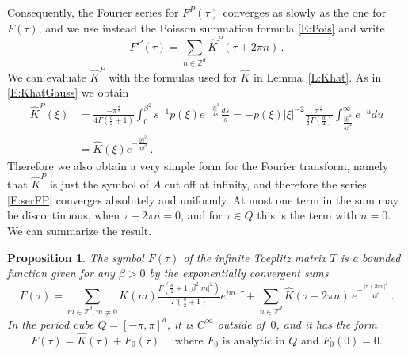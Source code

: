 \documentclass[12pt]{amsart}
\newtheorem{proposition}[theorem]{Proposition}
\theoremstyle{definition}
\theoremstyle{remark}
\numberwithin{equation}{section}
\newcommand\Z{{\mathbb Z}}
\let\hat=\widehat
\begin{document}
Consequently, the Fourier series for $F^{P}(\tau)$ converges as slowly as the one for $F(\tau)$, and we use instead the Poisson summation formula \eqref{E:Pois} and write
\begin{equation}
\label{E:serFP}
 F^{P}(\tau) = \sum_{n\in\Z^{d}}\hat K^{P}(\tau+2\pi n)\,.
\end{equation}
We can evaluate $\hat K^{P}$ with the formulas used for $\hat K$ in Lemma~\ref{L:Khat}. As in \eqref{E:KhatGauss} we obtain
\begin{equation}
\begin{aligned}
\label{E:KPhat=KhatxG}
 \hat K^{P}(\xi) &=
 \frac{-\pi^{\frac d2}}{4\Gamma(\frac d2+1)}\int_{0}^{\beta^{2}}\!\!\!\! s^{-1}p(\xi)e^{-\frac{|\xi|^{2}}{4s}}\tfrac{ds}{s}
=   -p(\xi) |\xi|^{-2} \frac{\pi^{\frac d2}}{\frac d2\Gamma(\frac d2)}\int_{\frac{|\xi|^{2}}{4\beta^{2}}}^{\infty} e^{-u}du\\
&= \hat K(\xi)  e^{-\frac{|\xi|^{2}}{4\beta^{2}}}\,.
\end{aligned}
\end{equation}
Therefore we also obtain a very simple form for the Fourier transform, namely that $\hat K^{P}$ is just the symbol of $A$ cut off at infinity, and therefore the series \eqref{E:serFP} converges absolutely and uniformly. At most one term in the sum may be discontinuous, when $\tau+2\pi n=0$, and for $\tau\in Q$ this is the term with $n=0$.
We can summarize the result.
\begin{proposition}
 \label{P:NumSym}
The symbol $F(\tau)$ of the infinite Toeplitz matrix $T$ is a bounded function given for any $\beta>0$ by the exponentially convergent sums
\begin{equation}
\label{E:Fewald}
 F(\tau) = 
 \sum_{m\in\Z^{d},m\ne0}K(m)\tfrac{\Gamma(\tfrac d2+1,\beta^{2}|m|^{2})}{\Gamma(\frac d2+1)}e^{im\cdot \tau} +
 \sum_{n\in\Z^{d}}\hat K(\tau+2\pi n)\,e^{-\frac{|\tau+2\pi n|^{2}}{4\beta^{2}}}\,.
\end{equation}
In the period cube $Q=[-\pi,\pi]^{d}$, it is $C^{\infty}$ outside of $\,0$, and it has the form
\begin{equation}
\label{E:F=F0+Khat} 
 F(\tau) = \hat K(\tau) + F_{0}(\tau) \quad\mbox{ where $F_{0}$ is analytic in $Q$ and $F_{0}(0)=0$}.  
\end{equation}
\end{proposition}
\end{document}
